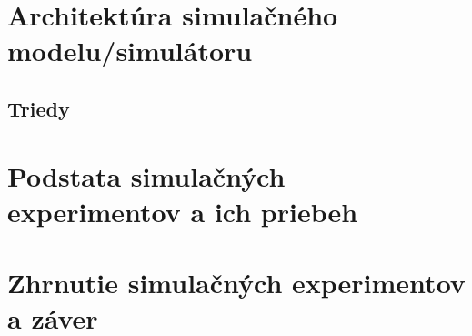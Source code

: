 \documentclass[a4paper, 11pt]{article}
\begin{document}
\section{Architektúra simulačného modelu/simulátoru}

\subsection{Triedy}



\section{Podstata simulačných experimentov a ich priebeh}

\section{Zhrnutie simulačných experimentov a záver}
\end{document}
